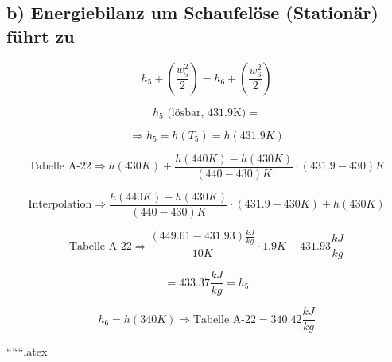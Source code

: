 \subsection*{b) Energiebilanz um Schaufelöse (Stationär) führt zu}

\[
h_5 + \left( \frac{w_5^2}{2} \right) = h_6 + \left( \frac{w_6^2}{2} \right)
\]

\[
h_5 \text{ (lösbar, 431.9K)} = 
\]

\[
\Rightarrow h_5 = h(T_5) = h(431.9K)
\]

\[
\text{Tabelle A-22} \Rightarrow h(430K) + \frac{h(440K) - h(430K)}{(440 - 430)K} \cdot (431.9 - 430)K
\]

\[
\text{Interpolation} \Rightarrow \frac{h(440K) - h(430K)}{(440 - 430)K} \cdot (431.9 - 430K) + h(430K)
\]

\[
\text{Tabelle A-22} \Rightarrow \frac{(449.61 - 431.93) \frac{kJ}{kg}}{10K} \cdot 1.9K + 431.93 \frac{kJ}{kg}
\]

\[
= 433.37 \frac{kJ}{kg} = h_5
\]

\[
h_6 = h(340K) \Rightarrow \text{Tabelle A-22} = 340.42 \frac{kJ}{kg}
\]

``````latex